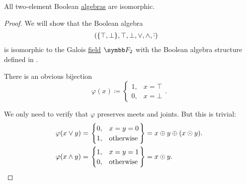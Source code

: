 \begin{proposition}\label{thm:binary_boolean_algebras_are_isomorphic}
  All two-element Boolean \hyperref[def:boolean_algebra]{algebras} are isomorphic.
\end{proposition}
\begin{proof}
  We will show that the Boolean algebra
  \begin{align*}
    &\left( \{ \top, \bot \}, \top, \bot, \vee, \wedge, \overline{\cdot} \right)
  \end{align*}
  is isomorphic to the Galois \hyperref[thm:galois_field_existence]{field} \( \BF_2 \) with the Boolean algebra structure defined in .

  There is an obvious bijection
  \begin{equation*}
    \varphi(x) \coloneqq \begin{cases}
      1, &x = \top \\
      0, &x = \bot
    \end{cases}.
  \end{equation*}

  We only need to verify that \( \varphi \) preserves meets and joints. But this is trivial:
  \begin{align*}
    \varphi(x \vee y)
    &=
    \begin{rcases}
      \begin{cases}
        0, &x = y = 0 \\
        1, &\text{otherwise}
      \end{cases}
    \end{rcases}
    =
    x \oplus y \oplus (x \odot y).
    \\
    \varphi(x \wedge y)
    &=
    \begin{rcases}
      \begin{cases}
        1, &x = y = 1 \\
        0, &\text{otherwise}
      \end{cases}
    \end{rcases}
    =
    x \odot y.
  \end{align*}
\end{proof}
